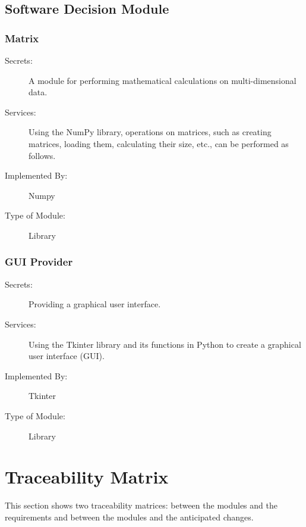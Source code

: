 \documentclass[12pt, titlepage]{article}
\begin{document}
\subsection{Software Decision Module}

\subsubsection{Matrix}
\begin{description}
\item[Secrets:] A module for performing mathematical calculations on multi-dimensional data.
\item[Services:] Using the NumPy library, operations on matrices, such as creating matrices, loading them, calculating their size, etc., can be performed as follows.
\item[Implemented By:] Numpy
\item[Type of Module:] Library
\end{description}

\subsubsection{GUI Provider}
\begin{description}
\item[Secrets:] Providing a graphical user interface.
\item[Services:] Using the Tkinter library and its functions in Python to create a graphical user interface (GUI).
\item[Implemented By:] Tkinter
\item[Type of Module:] Library
\end{description}
\section{Traceability Matrix} \label{SecTM}

This section shows two traceability matrices: between the modules and the
requirements and between the modules and the anticipated changes.
\end{document}
